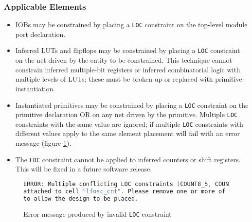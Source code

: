 \documentclass[11pt]{article}
\newcommand{\tokenstyle}[1]{\texttt{#1}}
\begin{document}
\subsubsection{Applicable Elements}

\begin{itemize}

\item IOBs may be constrained by placing a \tokenstyle{LOC} constraint on the top-level module port declaration.

\item Inferred LUTs and flipflops may be constrained by placing a \tokenstyle{LOC} constraint on the net driven by the
entity to be constrained. This technique cannot constrain inferred multiple-bit registers or inferred
combinatorial logic with multiple levels of LUTs; these must be broken up or replaced with primitive instantiation.

\item Instantiated primitives may be constrained by placing a \tokenstyle{LOC} constraint on the primitive declaration
OR on any net driven by the primitive. Multiple \tokenstyle{LOC} constraints with the same value are ignored; if
multiple \tokenstyle{LOC} constraints with different values apply to the same element placement will fail with an error
message (figure \ref{conflicting-loc}).

\item The \tokenstyle{LOC} constraint cannot be applied to inferred counters or shift registers. This will be fixed in
a future software release.

\end{itemize}

\begin{figure}[h]
\begin{lstlisting}[language=c]
ERROR: Multiple conflicting LOC constraints (COUNT8_5, COUNT8_4) are
attached to cell "lfosc_cnt". Please remove one or more of the constraints
to allow the design to be placed.
\end{lstlisting}
\caption{Error message produced by invalid \tokenstyle{LOC} constraint}
\label{conflicting-loc}
\end{figure}

\pagebreak
\end{document}

